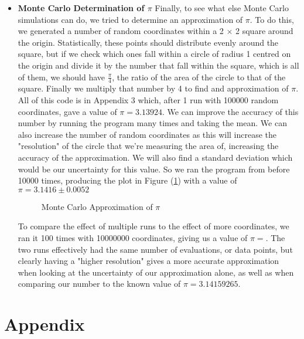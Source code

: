 \documentclass[12pt]{article}
\begin{document}
\begin{itemize}
        \item \textbf{Monte Carlo Determination of $\pi$}\newline
        Finally, to see what else Monte Carlo simulations can do, we tried to determine an approximation 
        of $\pi$. To do this, we generated a number of random coordinates within a 2 $\times$ 2 square 
        around the origin. Statistically, these points should distribute evenly around the square, 
        but if we check which ones fall within a circle of radius 1 centred on the origin and divide 
        it by the number that fall within the square, which is all of them, we should have 
        $\frac{\pi}{4}$, the ratio of the area of the circle to that of the square. Finally we 
        multiply that number by 4 to find and approximation of $\pi$. All of this code is in 
        Appendix 3 which, after 1 run with 100000 random coordinates, gave a value of $\pi = 3.13924$. 
        \newline
        We can improve the accuracy of this number by running the program many times and taking the 
        mean. We can also increase the number of random coordinates as this will increase the "resolution" 
        of the circle that we're measuring the area of, increasing the accuracy of the approximation.
        We will also find a standard deviation which would be our uncertainty for this value. So we ran 
        the program from before 10000 times, producing the plot in Figure (\ref{fig:ApproxPi}) with 
        a value of $\pi = 3.1416 \pm 0.0052$
        
        \begin{figure}[H]
            \begin{center}
               \scalebox{.7}{}
               \caption{Monte Carlo Approximation of $\pi$}
               \label{fig:ApproxPi}
            \end{center}
        \end{figure}
        
        \noindent
        To compare the effect of multiple runs to the effect of more coordinates, we ran it 100 times with 
        10000000 coordinates, giving us a value of $\pi = $. The two runs effectively had the same number 
        of evaluations, or data points, but clearly having a "higher resolution" gives a more accurate 
        approximation when looking at the uncertainty of our approximation alone, as well as when 
        comparing our number to the known value of $\pi = 3.14159265$. 
        

    \end{itemize}
    \newpage
    \section{Appendix}
    \setcounter{figure}{0} \renewcommand{\thefigure}{A.\arabic{figure}}
    
    
    
    
\end{document}

